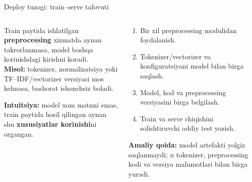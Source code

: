 \documentclass[aspectratio=169,11pt]{beamer}
\newcommand{\uzq}{\textquotesingle{}}   %
\begin{document}
\begin{frame}{Deploy tuzog\uzq{}i: train--serve tafovuti}
  \small

  \begin{columns}[T,totalwidth=\textwidth]
    \begin{column}{0.51\textwidth}
      \begin{tcolorbox}[warnbox,title={Muammo: training-serving skew},top=2pt,bottom=2pt]
        \footnotesize
        Train paytida ishlatilgan \textbf{preprocessing} xizmatda aynan
        takrorlanmasa, model boshqa ko\uzq{}rinishdagi kirishni ko\uzq{}radi.\\[3pt]

        \textbf{Misol:} tokenizer, normalizatsiya yoki TF--IDF/vectorizer
        versiyasi mos kelmasa, bashorat ishonchsiz bo\uzq{}ladi.
      \end{tcolorbox}

      \vspace{4pt}

      \begin{tcolorbox}[defbox,top=2pt,bottom=2pt]
        \scriptsize
        \textbf{Intuitsiya:} model xom matnni emas, train paytida hosil qilingan
        aynan shu \textbf{xususiyatlar ko\uzq{}rinishi}ni o\uzq{}rgangan.
      \end{tcolorbox}
    \end{column}

    \begin{column}{0.46\textwidth}
      \begin{tcolorbox}[okbox,title={Yechim},top=2pt,bottom=2pt]
        \footnotesize
        \begin{enumerate}\setlength\itemsep{2pt}
          \item Bir xil preprocessing modulidan foydalanish.
          \item Tokenizer/vectorizer va konfiguratsiyani model bilan birga
                saqlash.
          \item Model, kod va preprocessing versiyasini birga belgilash.
          \item Train va serve chiqishini solishtiruvchi oddiy test yozish.
        \end{enumerate}
      \end{tcolorbox}

      \vspace{4pt}

      \begin{tcolorbox}[okbox,top=2pt,bottom=2pt]
        \scriptsize
        \textbf{Amaliy qoida:}
        model artefakti yolg\uzq{}iz saqlanmaydi; u tokenizer,
        preprocessing kodi va versiya ma\uzq{}lumotlari bilan birga yuradi.
      \end{tcolorbox}
    \end{column}
  \end{columns}
\end{frame}
\end{document}
